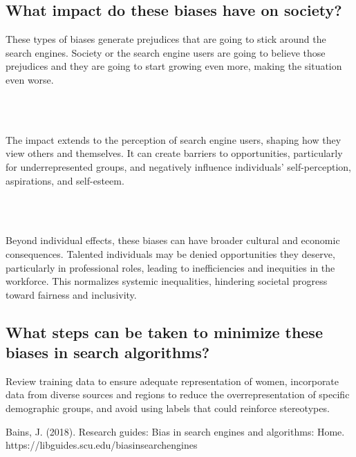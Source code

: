 \documentclass[twoside]{article}
\begin{document}
\subsection*{What impact do these biases have on society?}
\begin{justifying}
These types of biases generate prejudices that are going to stick around the search engines. Society or the search engine users are going to believe those prejudices and they are going to start growing even more, making the situation even worse.
\end{justifying}
\\
\\
\begin{justifying}
The impact extends to the perception of search engine users, shaping how they view others and themselves. It can create barriers to opportunities, particularly for underrepresented groups, and negatively influence individuals' self-perception, aspirations, and self-esteem.
\end{justifying}
\\
\\
\begin{justifying}
Beyond individual effects, these biases can have broader cultural and economic consequences. Talented individuals may be denied opportunities they deserve, particularly in professional roles, leading to inefficiencies and inequities in the workforce. This normalizes systemic inequalities, hindering societal progress toward fairness and inclusivity.
\end{justifying}



\subsection*{What steps can be taken to minimize these biases in search algorithms?}
\begin{justifying}
	Review training data to ensure adequate representation of women, incorporate data from diverse sources and regions to reduce the overrepresentation of specific demographic groups, and avoid using labels that could reinforce stereotypes.
\end{justifying}


\begin{thebibliography}{9}
	Bains, J. (2018). Research guides: Bias in search engines and algorithms: Home. https://libguides.scu.edu/biasinsearchengines
\end{thebibliography}
\end{document}
